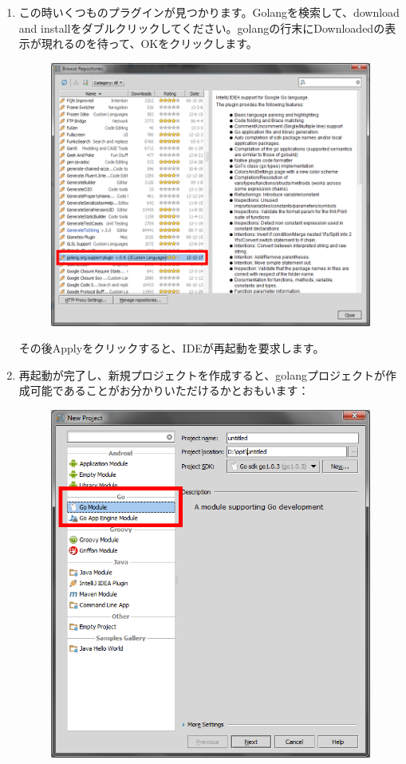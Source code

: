 \begin{enumerate}
\begin{figure}[H]
    \end{figure}
  \item この時いくつものプラグインが見つかります。Golangを検索して、download and installをダブルクリックしてください。golangの行末にDownloadedの表示が現れるのを待って、OKをクリックします。
    \begin{figure}[H]
      \includegraphics[width=14cm]{1.4.idea4.png}
    \end{figure}
    その後Applyをクリックすると、IDEが再起動を要求します。
  \item 再起動が完了し、新規プロジェクトを作成すると、golangプロジェクトが作成可能であることがお分かりいただけるかとおもいます：
    \begin{figure}[H]
      \includegraphics[width=14cm]{1.4.idea5.png}

\end{figure}
\end{enumerate}
